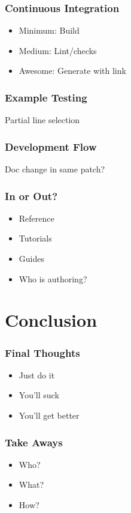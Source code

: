 \begin{frame}
\frametitle{Continuous Integration}

\begin{itemize}
\item Minimum: Build
\item Medium: Lint/checks
\item Awesome: Generate with link
\end{itemize}

\end{frame}

\begin{frame}
\frametitle{Example Testing}

Partial line selection
\end{frame}


\begin{frame}
\frametitle{Development Flow}

Doc change in same patch?
\end{frame}

\begin{frame}
\frametitle{In or Out?}

\begin{itemize}
\item Reference
\item Tutorials
\item Guides
\item Who is authoring?
\end{itemize}

\end{frame}

\section{Conclusion}

\begin{frame}
\frametitle{Final Thoughts}

\begin{itemize}
\item Just do it
\item You'll suck
\item You'll get better
\end{itemize}

\end{frame}

\begin{frame}
\frametitle{Take Aways}

\begin{itemize}
\item Who?
\item What?
\item How?
\end{itemize}

\end{frame}


